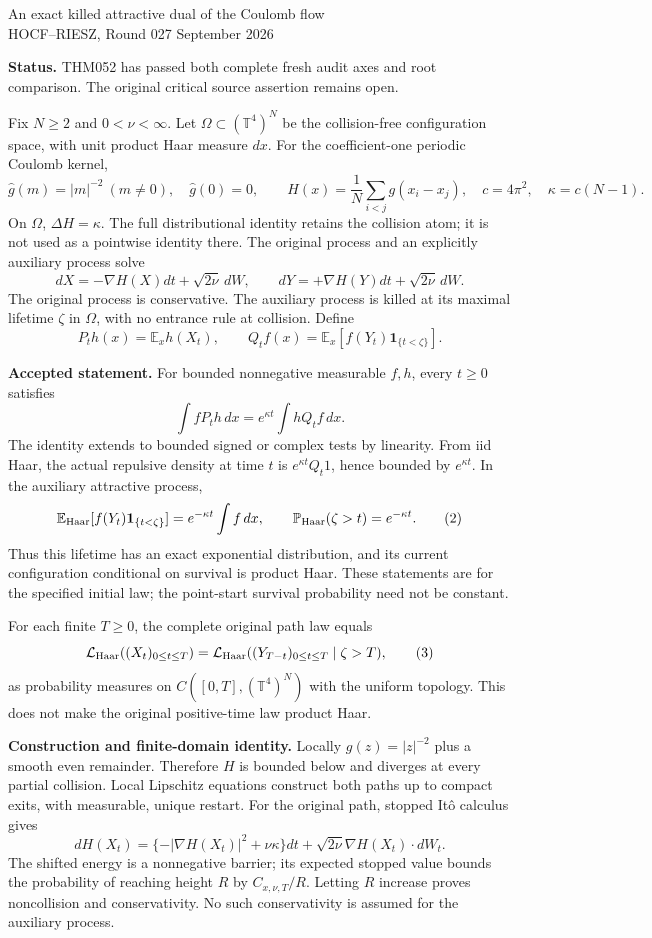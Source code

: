\documentclass[11pt]{article}
\newcommand{\E}{\mathbb E}
\begin{document}
\begin{center}
{\large An exact killed attractive dual of the Coulomb flow}\\[4pt]
HOCF--RIESZ, Round 027  September 2026
\end{center}
\noindent\textbf{Status.} THM052 has passed both complete fresh audit axes and root comparison. The original critical source assertion remains open.

Fix $N\ge2$ and $0<\nu<\infty$. Let $\Omega\subset(\mathbb T^4)^N$ be the collision-free configuration space, with unit product Haar measure $dx$. For the coefficient-one periodic Coulomb kernel,
\[
 \widehat g(m)=|m|^{-2}\ (m\ne0),\quad\widehat g(0)=0,\qquad
 H(x)=\frac1N\sum_{i<j}g(x_i-x_j),\quad c=4\pi^2,\quad\kappa=c(N-1).
\]
On $\Omega$, $\Delta H=\kappa$. The full distributional identity retains the collision atom; it is not used as a pointwise identity there. The original process and an explicitly auxiliary process solve
\[
 dX=-\nabla H(X)dt+\sqrt{2\nu}\,dW,\qquad
 dY=+\nabla H(Y)dt+\sqrt{2\nu}\,dW.
\]
The original process is conservative. The auxiliary process is killed at its maximal lifetime $\zeta$ in $\Omega$, with no entrance rule at collision. Define
\[
 P_th(x)=\E_xh(X_t),\qquad Q_tf(x)=\E_x[f(Y_t)\mathbf1_{\{t<\zeta\}}].
\]

\noindent\textbf{Accepted statement.}
For bounded nonnegative measurable $f,h$, every $t\ge0$ satisfies
\[
 \int fP_th\,dx=e^{\kappa t}\int hQ_tf\,dx.\tag{1}
\]
The identity extends to bounded signed or complex tests by linearity. From iid Haar, the actual repulsive density at time $t$ is $e^{\kappa t}Q_t1$, hence bounded by $e^{\kappa t}$. In the auxiliary attractive process,
\[
 \E_{\rm Haar}[f(Y_t)\mathbf1_{\{t<\zeta\}}]
   =e^{-\kappa t}\int f\,dx,\qquad
 \mathbb P_{\rm Haar}(\zeta>t)=e^{-\kappa t}.\tag{2}
\]
Thus this lifetime has an exact exponential distribution, and its current configuration conditional on survival is product Haar. These statements are for the specified initial law; the point-start survival probability need not be constant.

For each finite $T\ge0$, the complete original path law equals
\[
 \mathcal L_{\rm Haar}((X_t)_{0\le t\le T})
 =\mathcal L_{\rm Haar}((Y_{T-t})_{0\le t\le T}\mid\zeta>T),\tag{3}
\]
as probability measures on $C([0,T],(\mathbb T^4)^N)$ with the uniform topology. This does not make the original positive-time law product Haar.

\newpage
\noindent\textbf{Construction and finite-domain identity.}
Locally $g(z)=|z|^{-2}$ plus a smooth even remainder. Therefore $H$ is bounded below and diverges at every partial collision. Local Lipschitz equations construct both paths up to compact exits, with measurable, unique restart. For the original path, stopped It\^o calculus gives
\[
 dH(X_t)=\{-|\nabla H(X_t)|^2+\nu\kappa\}dt
                   +\sqrt{2\nu}\nabla H(X_t)\cdot dW_t.
\]
The shifted energy is a nonnegative barrier; its expected stopped value bounds the probability of reaching height $R$ by $C_{x,\nu,T}/R$. Letting $R$ increase proves noncollision and conservativity. No such conservativity is assumed for the auxiliary process.
\end{document}
